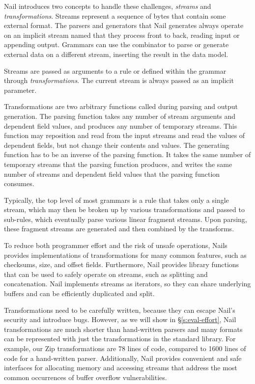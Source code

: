 Nail introduces two concepts to handle these challenges, \emph{streams} and \emph{transformations}. 
Streams represent a sequence of bytes that contain some external format. The parsers and generators
that Nail generates always operate on an implicit stream named  that they process front to
back, reading input or appending output.
Grammars can use the  combinator to parse or generate external data on a different stream,
inserting the result in the data model.

Streams are passed as arguments to a rule or defined within the grammar through \emph{transformations}.
The current stream is always passed as an implicit parameter.

Transformations are two arbitrary functions called during parsing and output generation.
The parsing function  takes any number of stream arguments and dependent field values,
and produces any number of temporary streams. This function may reposition and read from the
input streams and read the values of dependent fields, but not change their contents and values. 
The generating function has to be an inverse of the parsing function. It takes the same number of
temporary streams that the parsing function produces, and writes the same number of streams and
dependent field values that the parsing function consumes.

Typically, the top level of most grammars is a rule that takes only a single stream, which may then
be broken up by various transformations and passed to sub-rules, which eventually parse various linear
fragment streams. Upon parsing, these fragment streams are generated and then combined by the
transforms.

 To reduce both programmer effort and the risk of unsafe operations, Nails provides implementations of
transformations for many common features, such as checksums, size, and offset fields. Furthermore,
Nail provides library functions that can be used to safely operate on streams, such as splitting and
concatenation. Nail implements streams as iterators, so they can share underlying buffers and can be
efficiently duplicated and split.

Transformations need to be carefully written, because they can escape Nail's security and introduce
bugs. However, as we will show in \S\ref{s:eval-effort}, Nail transformations are much shorter than
hand-written parsers and many formats can be represented with just the transformations in the
standard library. 
For example, our Zip transformations are 78 lines of code, compared to 1600 lines of code for a
   hand-written parser. Additionally, Nail provides convenient and safe interfaces for allocating
   memory and accessing streams that address the most common occurrences of buffer overflow
   vulnerabilities.  

